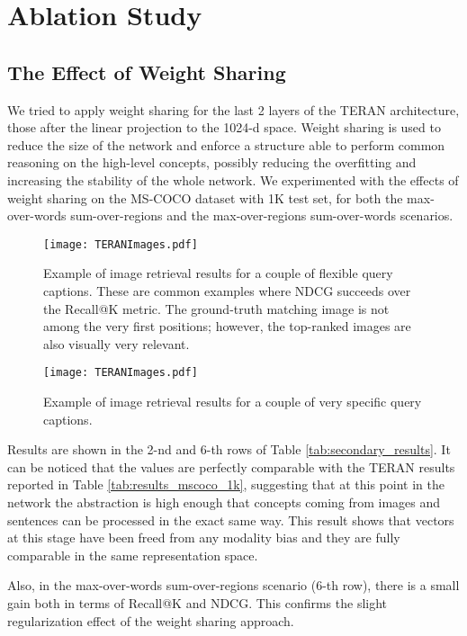 \documentclass[acmsmall]{acmart}
\begin{document}
\section{Ablation Study}
\subsection{The Effect of Weight Sharing}
\label{sec:weight_sharing}
We tried to apply weight sharing for the last 2 layers of the TERAN architecture, those after the linear projection to the 1024-d space. Weight sharing is used to reduce the size of the network and enforce a structure able to perform common reasoning on the high-level concepts, possibly reducing the overfitting and increasing the stability of the whole network.
We experimented with the effects of weight sharing on the MS-COCO dataset with 1K test set, for both the max-over-words sum-over-regions and the max-over-regions sum-over-words scenarios. 

\begin{figure*}[t]
    \centering
    \texttt{[image: TERANImages.pdf]}
  \caption{Example of image retrieval results for a couple of flexible query captions. These are common examples where NDCG succeeds over the Recall@K metric. The ground-truth matching image is not among the very first positions; however, the top-ranked images are also visually very relevant.}
  \label{fig:examples_ndcg} 
\end{figure*}

\begin{figure*}[t]
    \centering
    \texttt{[image: TERANImages.pdf]}
  \caption{Example of image retrieval results for a couple of very specific query captions.}
  \label{fig:examples_exact_matching} 
\end{figure*}



Results are shown in the 2-nd and 6-th rows of Table \ref{tab:secondary_results}. It can be noticed that the values are perfectly comparable with the TERAN results reported in Table \ref{tab:results_mscoco_1k}, suggesting that at this point in the network the abstraction is high enough that concepts coming from images and sentences can be processed in the exact same way. This result shows that vectors at this stage have been freed from any modality bias and they are fully comparable in the same representation space.

Also, in the max-over-words sum-over-regions scenario (6-th row), there is a small gain both in terms of Recall@K and NDCG. This confirms the slight regularization effect of the weight sharing approach.
\end{document}

